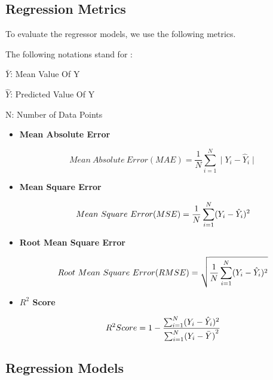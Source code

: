 \documentclass[12pt,letter-paper]{article}
\begin{document}
    \subsection{Regression Metrics}
 
        To evaluate the regressor models, we use the following metrics.
        
        \begin{flushleft}
        
            The following notations stand for : 
            
            $\bar{Y}$: Mean Value Of Y
        
            $\hat{Y}$: Predicted Value Of Y
        
            N: Number of Data Points
        
        \end{flushleft}
        
        \begin{itemize}
        
            \item\textbf{Mean Absolute Error}
            
                \[Mean\ Absolute\ Error(MAE) =  \frac{1}{N}\sum_{i=1}^{N}\mid Y_i - \hat Y_i\mid\]
                
            \item\textbf{Mean Square Error}
            
                \[Mean\ Square\ Error(MSE) =  \frac{1}{N}\sum_{i=1}^{N}(Y_i - \hat Y_i)\\^2\]
            
            \item\textbf{Root Mean Square Error}
            
                \[Root\ Mean\ Square\ Error(RMSE) =  \sqrt{\frac{1}{N}\sum_{i=1}^{N}(Y_i - \hat Y_i)\\^2}\]
                
                
            \item\textbf{$R^2$ Score}
            
                \[R^2 Score = 1 - \frac{\sum_{i=1}^{N}(Y_i - \hat Y_i)\\^2}{\sum_{i = 1}^{N}({Y_i - \bar{Y})}^2}\]
            
        \end{itemize}
        
    \subsection{Regression Models}
    
\end{document}
